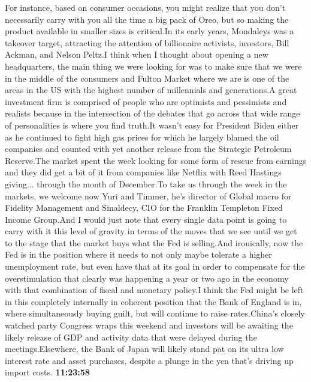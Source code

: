 \documentclass{article}%
\begin{document}
For instance, based on consumer occasions, you might realize that you don't necessarily carry with you all the time a big pack of Oreo, but so making the product available in smaller sizes is critical.In its early years, Mondaleys was a takeover target, attracting the attention of billionaire activists, investors, Bill Ackman, and Nelson Peltz.I think when I thought about opening a new headquarters, the main thing we were looking for was to make sure that we were in the middle of the consumers and Fulton Market where we are is one of the areas in the US with the highest number of millennials and generations.A great investment firm is comprised of people who are optimists and pessimists and realists because in the intersection of the debates that go across that wide range of personalities is where you find truth.It wasn't easy for President Biden either as he continued to fight high gas prices for which he largely blamed the oil companies and counted with yet another release from the Strategic Petroleum Reserve.The market spent the week looking for some form of rescue from earnings and they did get a bit of it from companies like Netflix with Reed Hastings giving...  through the month of December.To take us through the week in the markets, we welcome now Yuri and Timmer, he's director of Global macro for Fidelity Management and Sinaldecy, CIO for the Franklin Templeton Fixed Income Group.And I would just note that every single data point is going to carry with it this level of gravity in terms of the moves that we see until we get to the stage that the market buys what the Fed is selling.And ironically, now the Fed is in the position where it needs to not only maybe tolerate a higher unemployment rate, but even have that at its goal in order to compensate for the overstimulation that clearly was happening a year or two ago in the economy with that combination of fiscal and monetary policy.I think the Fed might be left in this completely internally in coherent position that the Bank of England is in, where simultaneously buying guilt, but will continue to raise rates.China's closely watched party Congress wraps this weekend and investors will be awaiting the likely release of GDP and activity data that were delayed during the meetings.Elsewhere, the Bank of Japan will likely stand pat on its ultra low interest rate and asset purchases, despite a plunge in the yen that's driving up import costs.%
\textbf{11:23:58}%
\newline%
\end{document}
